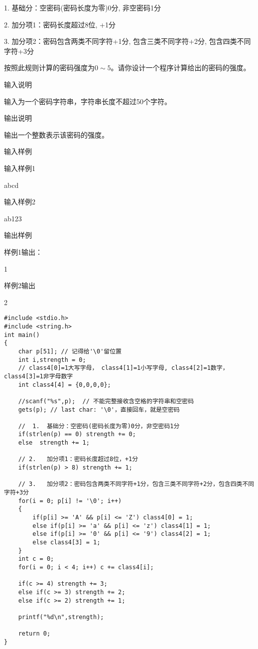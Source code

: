 1.	基础分：空密码(密码长度为零)0分, 非空密码1分

2.	加分项1：密码长度超过8位, +1分

3.	加分项2：密码包含两类不同字符+1分, 包含三类不同字符+2分, 包含四类不同字符+3分

按照此规则计算的密码强度为$0\sim 5$。请你设计一个程序计算给出的密码的强度。

输入说明

输入为一个密码字符串，字符串长度不超过50个字符。

输出说明

输出一个整数表示该密码的强度。

输入样例

输入样例1

abcd

输入样例2

ab123

输出样例

样例1输出：

1

样例2输出

2

\begin{lstlisting}	
#include <stdio.h>
#include <string.h>
int main()
{
	char p[51]; // 记得给'\0'留位置
	int i,strength = 0;
	// class4[0]=1大写字母， class4[1]=1小写字母, class4[2]=1数字， class4[3]=1非字母数字 
	int class4[4] = {0,0,0,0};  
	
	//scanf("%s",p);  // 不能完整接收含空格的字符串和空密码 
	gets(p); // last char: '\0'，直接回车，就是空密码 
	
	// 	1.	基础分：空密码(密码长度为零)0分，非空密码1分 
	if(strlen(p) == 0) strength += 0;
	else  strength += 1;
	
	// 2.	加分项1：密码长度超过8位，+1分 
	if(strlen(p) > 8) strength += 1;
	
	// 3.	加分项2：密码包含两类不同字符+1分，包含三类不同字符+2分，包含四类不同字符+3分 
	for(i = 0; p[i] != '\0'; i++)
	{
		if(p[i] >= 'A' && p[i] <= 'Z') class4[0] = 1; 
		else if(p[i] >= 'a' && p[i] <= 'z') class4[1] = 1; 
		else if(p[i] >= '0' && p[i] <= '9') class4[2] = 1;
		else class4[3] = 1; 
	}
	int c = 0;
	for(i = 0; i < 4; i++) c += class4[i];
	
	if(c >= 4) strength += 3;
	else if(c >= 3) strength += 2;
	else if(c >= 2) strength += 1;
	
	printf("%d\n",strength);
	
	return 0;
}
\end{lstlisting}

